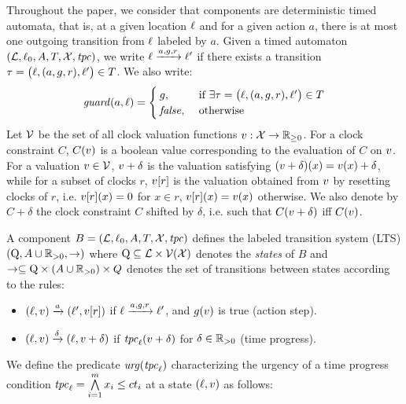 Throughout the paper, we consider that components are deterministic timed automata, that is, 
at a given location $\ell$ and for a given action $a$, there is at most one outgoing transition from $\ell$ labeled by $a$. 
Given a timed automaton $(\mathcal{L}, \ell_0, A, T, \mathcal{X}, \mathit{tpc})$, we write $\ell \xrightarrow{a,g,r} \ell'$ 
if there exists a transition $\tau = \big(\ell,(a,g,r),\ell'\big) \in T$. 
We also write: 
\begin{displaymath}
  \mathit{guard}(a,\ell)=
  \begin{cases}
    g, &\text{ if } \exists\tau = \big(\ell,(a,g,r),\ell'\big) \in T\\
    \textnormal{\textit{false}}, &\text{ otherwise }
  \end{cases}
\end{displaymath}
Let $\mathcal{V}$ be the set of all clock valuation functions
$v: \mathcal{X}\rightarrow \mathbb{R}_{\ge
  0}$. 
For a clock constraint $C$, $C(v)$ is a boolean value corresponding to the evaluation of $C$ on
$v$. For a valuation $v \in \mathcal{V}$, $v + \delta$ is the valuation satisfying
$(v + \delta)(x) = v(x) + \delta$, while for a subset of clocks $r$, $v[r]$ 
is the valuation obtained from $v$ by resetting clocks of $r$, i.e. 
$v[r](x) = 0$ for $x\in r$, $v[r](x) = v(x)$ otherwise.
We also denote by $C+\delta$ the clock constraint $C$ shifted by $\delta$, i.e. such that $C(v+\delta)$ iff $C(v)$.
\begin{definition}[Semantics]
  \label{def:atom_sem}
  A component $B = (\mathcal{L}, \ell_0, A, T, \mathcal{X}, \mathit{tpc})$ defines the labeled transition system (LTS) 
  $(\mathrm{Q}, A\cup\mathbb R_{> 0}, \rightarrow)$ where $\mathrm{Q}\subseteq\mathcal{L}\times\mathcal{V}(\mathcal{X})$ denotes the \emph{states} of $B$ 
  and  $\rightarrow\subseteq\mathrm{Q}\times(A\cup\mathbb R_{> 0}) \times
  Q$ denotes the set of transitions between states according to the rules:
    \begin{itemize}
    \item $(\ell,v) \xrightarrow{a} (\ell',v[r])$ if $\ell \xrightarrow{a,g,r} \ell'$, and $g(v)$ is true (action step).
      \item $(\ell,v) \xrightarrow{\delta} (\ell,v+\delta)$ if $\mathit{tpc}_{\ell}(v+\delta)$ for $\delta\in\mathbb R_{> 0}$
      (time progress).
    \end{itemize}
\end{definition}
We define the predicate $\textnormal{\textit{urg}}(\mathit{tpc}_{\ell})$ characterizing the urgency of a time progress condition
$\mathit{tpc}_{\ell}=\bigwedge\limits_{i=1}^m x_i\le ct_i$ at a state $(\ell,v)$ as follows:
